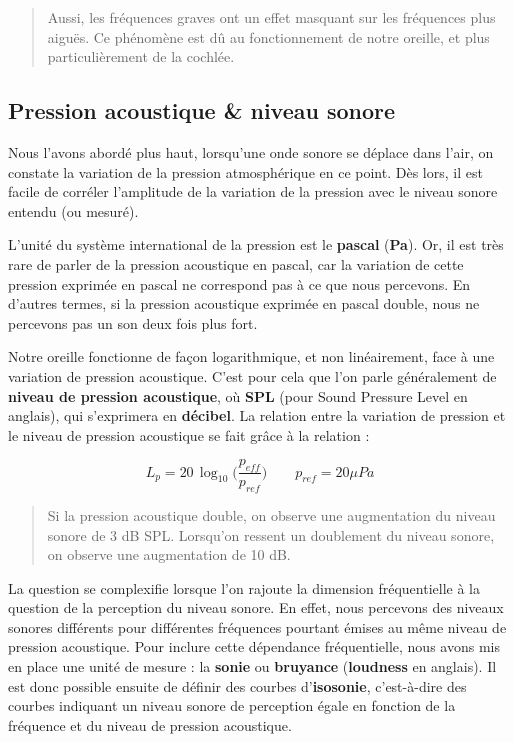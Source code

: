 \documentclass[
]{book}
\begin{document}
\begin{quote}
Aussi, les fréquences graves ont un effet masquant sur les fréquences plus aiguës. Ce phénomène est dû au fonctionnement de notre oreille, et plus particulièrement de la cochlée.
\end{quote}

\hypertarget{pression-acoustique-niveau-sonore}{%
\subsection{Pression acoustique \& niveau sonore}\label{pression-acoustique-niveau-sonore}}

Nous l'avons abordé plus haut, lorsqu'une onde sonore se déplace dans l'air, on constate la variation de la pression atmosphérique en ce point. Dès lors, il est facile de corréler l'amplitude de la variation de la pression avec le niveau sonore entendu (ou mesuré).

L'unité du système international de la pression est le \textbf{pascal} (\textbf{Pa}). Or, il est très rare de parler de la pression acoustique en pascal, car la variation de cette pression exprimée en pascal ne correspond pas à ce que nous percevons. En d'autres termes, si la pression acoustique exprimée en pascal double, nous ne percevons pas un son deux fois plus fort.

Notre oreille fonctionne de façon logarithmique, et non linéairement, face à une variation de pression acoustique. C'est pour cela que l'on parle généralement de \textbf{niveau de pression acoustique}, où \textbf{SPL} (pour Sound Pressure Level en anglais), qui s'exprimera en \textbf{décibel}. La relation entre la variation de pression et le niveau de pression acoustique se fait grâce à la relation :

\[L_p = 20\,\log_{10}\Big(\frac{p_{eff}}{p_{ref}}\Big) \qquad p_{ref} = 20\mu Pa\]

\begin{quote}
Si la pression acoustique double, on observe une augmentation du niveau sonore de 3 dB SPL. Lorsqu'on ressent un doublement du niveau sonore, on observe une augmentation de 10 dB.
\end{quote}

La question se complexifie lorsque l'on rajoute la dimension fréquentielle à la question de la perception du niveau sonore. En effet, nous percevons des niveaux sonores différents pour différentes fréquences pourtant émises au même niveau de pression acoustique. Pour inclure cette dépendance fréquentielle, nous avons mis en place une unité de mesure : la \textbf{sonie} ou \textbf{bruyance} (\textbf{loudness} en anglais). Il est donc possible ensuite de définir des courbes d'\textbf{isosonie}, c'est-à-dire des courbes indiquant un niveau sonore de perception égale en fonction de la fréquence et du niveau de pression acoustique.
\end{document}
